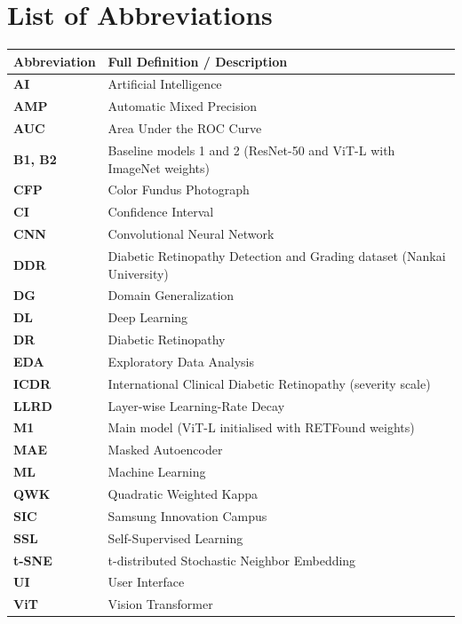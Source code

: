 \documentclass{sicaireport}
\begin{document}
\chapter*{List of Abbreviations}
\begin{table}[htbp]
    \renewcommand{\arraystretch}{1.4}
    \begin{tabularx}{\textwidth}{p{3.5cm} X}
        \toprule
        \textbf{Abbreviation} & \textbf{Full Definition / Description} \\
        \midrule
        \textbf{AI} & Artificial Intelligence \\
        \textbf{AMP} & Automatic Mixed Precision \\
        \textbf{AUC} & Area Under the ROC Curve \\
        \textbf{B1, B2} & Baseline models 1 and 2 (ResNet-50 and ViT-L with ImageNet weights) \\
        \textbf{CFP} & Color Fundus Photograph \\
        \textbf{CI} & Confidence Interval \\
        \textbf{CNN} & Convolutional Neural Network \\
        \textbf{DDR} & Diabetic Retinopathy Detection and Grading dataset (Nankai University) \\
        \textbf{DG} & Domain Generalization \\
        \textbf{DL} & Deep Learning \\
        \textbf{DR} & Diabetic Retinopathy \\
        \textbf{EDA} & Exploratory Data Analysis \\
        \textbf{ICDR} & International Clinical Diabetic Retinopathy (severity scale) \\
        \textbf{LLRD} & Layer-wise Learning-Rate Decay \\
        \textbf{M1} & Main model (ViT-L initialised with RETFound weights) \\
        \textbf{MAE} & Masked Autoencoder \\
        \textbf{ML} & Machine Learning \\
        \textbf{QWK} & Quadratic Weighted Kappa \\
        \textbf{SIC} & Samsung Innovation Campus \\
        \textbf{SSL} & Self-Supervised Learning \\
        \textbf{t-SNE} & t-distributed Stochastic Neighbor Embedding \\
        \textbf{UI} & User Interface \\
        \textbf{ViT} & Vision Transformer \\
        \bottomrule
    \end{tabularx}
\end{table}
\clearpage
\end{document}
